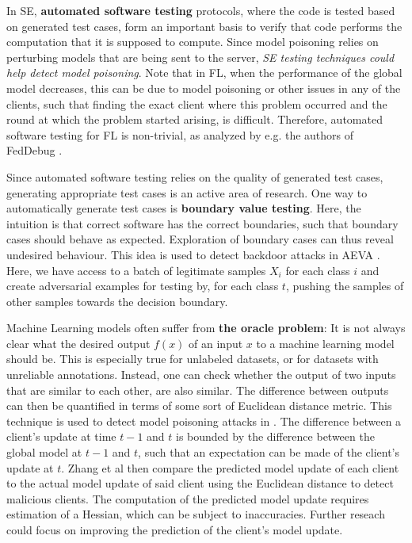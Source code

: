 \documentclass[11pt]{article}
\begin{document}
In SE, \textbf{automated software testing} protocols, where the code is tested based on generated test cases, form an important basis to verify that code performs the computation that it is supposed to compute. Since model poisoning relies on perturbing models that are being sent to the server, \textit{SE testing techniques could help detect model poisoning}. Note that in FL, when the performance of the global model decreases, this can be due to model poisoning or other issues in any of the clients, such that finding the exact client where this problem occurred and the round at which the problem started arising, is difficult. Therefore, automated software testing for FL is non-trivial, as analyzed by e.g. the authors of FedDebug \cite{gill2023feddebug}. 

Since automated software testing relies on the quality of generated test cases, generating appropriate test cases is an active area of research. One way to automatically generate test cases is \textbf{boundary value testing}. Here, the intuition is that correct software has the correct boundaries, such that boundary cases should behave as expected. Exploration of boundary cases can thus reveal undesired behaviour. This idea is used to detect backdoor attacks in AEVA \cite{guo2021aeva}. Here, we have access to a batch of legitimate samples $X_i$ for each class $i$ and create adversarial examples for testing by, for each class $t$, pushing the samples of other samples towards the decision boundary. 

Machine Learning models often suffer from \textbf{the oracle problem}: It is not always clear what the desired output $f(x)$ of an input $x$ to a machine learning model should be. This is especially true for unlabeled datasets, or for datasets with unreliable annotations. Instead, one can check whether the output of two inputs that are similar to each other, are also similar. The difference between outputs can then be quantified in terms of some sort of Euclidean distance metric. This technique is used to detect model poisoning attacks in \cite{zhang2022fldetector}. The difference between a client's update at time $t-1$ and $t$ is bounded by the difference between the global model at $t-1$ and $t$, such that an expectation can be made of the client's update at $t$. Zhang et al \cite{zhang2022fldetector} then compare the predicted model update of each client to the actual model update of said client using the Euclidean distance to detect malicious clients. The computation of the predicted model update requires estimation of a Hessian, which can be subject to inaccuracies. Further reseach could focus on improving the prediction of the client's model update. 
\end{document}
